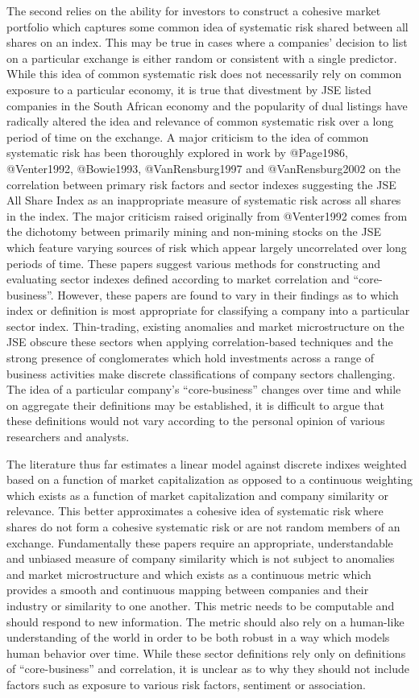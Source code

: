 \documentclass[11pt]{article}
\begin{document}
The second relies on the ability for investors to construct a cohesive
market portfolio which captures some common idea of systematic risk
shared between all shares on an index. This may be true in cases where a
companies' decision to list on a particular exchange is either random or
consistent with a single predictor. While this idea of common systematic
risk does not necessarily rely on common exposure to a particular
economy, it is true that divestment by JSE listed companies in the South
African economy and the popularity of dual listings have radically
altered the idea and relevance of common systematic risk over a long
period of time on the exchange. A major criticism to the idea of common
systematic risk has been thoroughly explored in work by @Page1986,
@Venter1992, @Bowie1993, @VanRensburg1997 and @VanRensburg2002 on the
correlation between primary risk factors and sector indexes suggesting
the JSE All Share Index as an inappropriate measure of systematic risk
across all shares in the index. The major criticism raised originally
from @Venter1992 comes from the dichotomy between primarily mining and
non-mining stocks on the JSE which feature varying sources of risk which
appear largely uncorrelated over long periods of time. These papers
suggest various methods for constructing and evaluating sector indexes
defined according to market correlation and ``core-business''. However,
these papers are found to vary in their findings as to which index or
definition is most appropriate for classifying a company into a
particular sector index. Thin-trading, existing anomalies and market
microstructure on the JSE obscure these sectors when applying
correlation-based techniques and the strong presence of conglomerates
which hold investments across a range of business activities make
discrete classifications of company sectors challenging. The idea of a
particular company's ``core-business'' changes over time and while on
aggregate their definitions may be established, it is difficult to argue
that these definitions would not vary according to the personal opinion
of various researchers and analysts.

The literature thus far estimates a linear model against discrete
indixes weighted based on a function of market capitalization as opposed
to a continuous weighting which exists as a function of market
capitalization and company similarity or relevance. This better
approximates a cohesive idea of systematic risk where shares do not form
a cohesive systematic risk or are not random members of an exchange.
Fundamentally these papers require an appropriate, understandable and
unbiased measure of company similarity which is not subject to anomalies
and market microstructure and which exists as a continuous metric which
provides a smooth and continuous mapping between companies and their
industry or similarity to one another. This metric needs to be
computable and should respond to new information. The metric should also
rely on a human-like understanding of the world in order to be both
robust in a way which models human behavior over time. While these
sector definitions rely only on definitions of ``core-business'' and
correlation, it is unclear as to why they should not include factors
such as exposure to various risk factors, sentiment or association.
\end{document}
